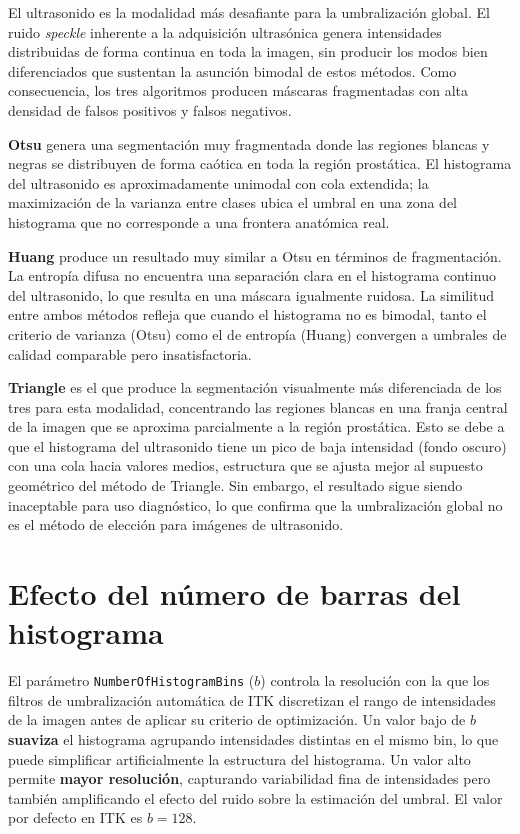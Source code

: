 \documentclass[12pt, a4paper]{article}
\begin{document}
El ultrasonido es la modalidad más desafiante para la umbralización global. El ruido
\textit{speckle} inherente a la adquisición ultrasónica genera intensidades distribuidas
de forma continua en toda la imagen, sin producir los modos bien diferenciados que
sustentan la asunción bimodal de estos métodos. Como consecuencia, los tres algoritmos
producen máscaras fragmentadas con alta densidad de falsos positivos y falsos negativos.

\textbf{Otsu} genera una segmentación muy fragmentada donde las regiones blancas y negras
se distribuyen de forma caótica en toda la región prostática. El histograma del ultrasonido
es aproximadamente unimodal con cola extendida; la maximización de la varianza entre clases
ubica el umbral en una zona del histograma que no corresponde a una frontera anatómica real.

\textbf{Huang} produce un resultado muy similar a Otsu en términos de fragmentación.
La entropía difusa no encuentra una separación clara en el histograma continuo del
ultrasonido, lo que resulta en una máscara igualmente ruidosa. La similitud entre ambos
métodos refleja que cuando el histograma no es bimodal, tanto el criterio de varianza
(Otsu) como el de entropía (Huang) convergen a umbrales de calidad comparable pero
insatisfactoria.

\textbf{Triangle} es el que produce la segmentación visualmente más diferenciada de
los tres para esta modalidad, concentrando las regiones blancas en una franja central de
la imagen que se aproxima parcialmente a la región prostática. Esto se debe a que el
histograma del ultrasonido tiene un pico de baja intensidad (fondo oscuro) con una cola
hacia valores medios, estructura que se ajusta mejor al supuesto geométrico del método
de Triangle. Sin embargo, el resultado sigue siendo inaceptable para uso diagnóstico,
lo que confirma que la umbralización global no es el método de elección para imágenes
de ultrasonido.

\section{Efecto del número de barras del histograma}

El parámetro \texttt{NumberOfHistogramBins} ($b$) controla la resolución con la que los
filtros de umbralización automática de ITK discretizan el rango de intensidades de la
imagen antes de aplicar su criterio de optimización. Un valor bajo de $b$ \textbf{suaviza}
el histograma agrupando intensidades distintas en el mismo bin, lo que puede simplificar
artificialmente la estructura del histograma. Un valor alto permite \textbf{mayor
resolución}, capturando variabilidad fina de intensidades pero también amplificando el
efecto del ruido sobre la estimación del umbral. El valor por defecto en ITK es
$b = 128$.
\end{document}
